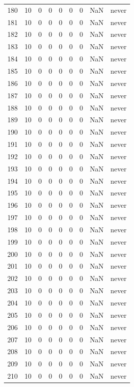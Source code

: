 \begin{longtable}{rrrrrrrrl}
180 & 10 & 0 & 0 & 0 & 0 & 0 & NaN & never \\
181 & 10 & 0 & 0 & 0 & 0 & 0 & NaN & never \\
182 & 10 & 0 & 0 & 0 & 0 & 0 & NaN & never \\
183 & 10 & 0 & 0 & 0 & 0 & 0 & NaN & never \\
184 & 10 & 0 & 0 & 0 & 0 & 0 & NaN & never \\
185 & 10 & 0 & 0 & 0 & 0 & 0 & NaN & never \\
186 & 10 & 0 & 0 & 0 & 0 & 0 & NaN & never \\
187 & 10 & 0 & 0 & 0 & 0 & 0 & NaN & never \\
188 & 10 & 0 & 0 & 0 & 0 & 0 & NaN & never \\
189 & 10 & 0 & 0 & 0 & 0 & 0 & NaN & never \\
190 & 10 & 0 & 0 & 0 & 0 & 0 & NaN & never \\
191 & 10 & 0 & 0 & 0 & 0 & 0 & NaN & never \\
192 & 10 & 0 & 0 & 0 & 0 & 0 & NaN & never \\
193 & 10 & 0 & 0 & 0 & 0 & 0 & NaN & never \\
194 & 10 & 0 & 0 & 0 & 0 & 0 & NaN & never \\
195 & 10 & 0 & 0 & 0 & 0 & 0 & NaN & never \\
196 & 10 & 0 & 0 & 0 & 0 & 0 & NaN & never \\
197 & 10 & 0 & 0 & 0 & 0 & 0 & NaN & never \\
198 & 10 & 0 & 0 & 0 & 0 & 0 & NaN & never \\
199 & 10 & 0 & 0 & 0 & 0 & 0 & NaN & never \\
200 & 10 & 0 & 0 & 0 & 0 & 0 & NaN & never \\
201 & 10 & 0 & 0 & 0 & 0 & 0 & NaN & never \\
202 & 10 & 0 & 0 & 0 & 0 & 0 & NaN & never \\
203 & 10 & 0 & 0 & 0 & 0 & 0 & NaN & never \\
204 & 10 & 0 & 0 & 0 & 0 & 0 & NaN & never \\
205 & 10 & 0 & 0 & 0 & 0 & 0 & NaN & never \\
206 & 10 & 0 & 0 & 0 & 0 & 0 & NaN & never \\
207 & 10 & 0 & 0 & 0 & 0 & 0 & NaN & never \\
208 & 10 & 0 & 0 & 0 & 0 & 0 & NaN & never \\
209 & 10 & 0 & 0 & 0 & 0 & 0 & NaN & never \\
210 & 10 & 0 & 0 & 0 & 0 & 0 & NaN & never \\

\end{longtable}
